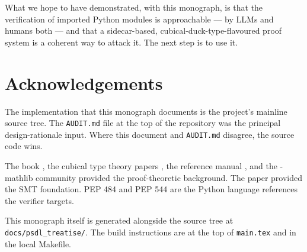 What we hope to have demonstrated, with this monograph, is that
the verification of imported Python modules is approachable --- by
LLMs and humans both --- and that a sidecar-based,
cubical-duck-type-flavoured proof system is a coherent way to
attack it.  The next step is to use it.

\section{Acknowledgements}

The implementation that this monograph documents is the
\Deppy{} project's mainline source tree.  The \texttt{AUDIT.md}
file at the top of the repository was the principal design-rationale
input.  Where this document and \texttt{AUDIT.md} disagree, the
source code wins.

The \HoTT{} book \citep{HoTT}, the cubical type theory papers
\citep{CCHM, ABCFHL, ABCHFL2017}, the \Lean{} reference manual
\citep{LeanRefManual}, and the \Lean{}-mathlib community
\citep{LeanCommunityMathlib} provided the proof-theoretic
background.  The \Zthree{} paper \citep{Z3} provided the SMT
foundation.  PEP 484 \citep{PEP484} and PEP 544 \citep{PEP544} are
the Python language references the verifier targets.

This monograph itself is generated alongside the source tree at
\texttt{docs/psdl\_treatise/}.  The build instructions are at the
top of \texttt{main.tex} and in the local Makefile.

